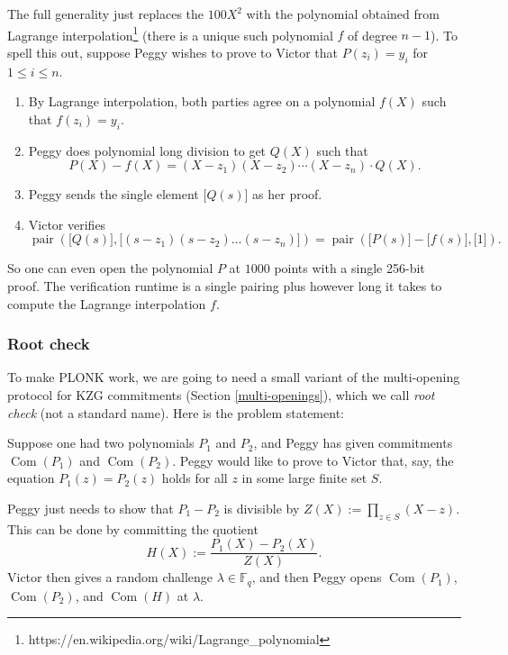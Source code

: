 The full generality just replaces the \(100X^{2}\) with the polynomial
obtained from Lagrange interpolation\footnote{https://en.wikipedia.org/wiki/Lagrange\_polynomial}
(there is a unique such polynomial \(f\) of degree \(n - 1\)). To spell
this out, suppose Peggy wishes to prove to Victor that
\(P( z_{i} ) = y_{i}\) for \(1 \leq i \leq n\).

\begin{algo}
\leavevmode
\begin{enumerate}
\item
  By Lagrange interpolation, both parties agree on a polynomial \(f(X)\)
  such that \(f( z_{i} ) = y_{i}\).
\item
  Peggy does polynomial long division to get \(Q(X)\) such that
  \[P(X) - f(X) = ( X - z_{1} )( X - z_{2} )\cdots( X - z_{n} ) \cdot Q(X).\]
\item
  Peggy sends the single element \(\lbrack Q(s) \rbrack\) as
  her proof.
\item
  Victor verifies 
\[  \operatorname{pair}(\lbrack Q(s) \rbrack,\lbrack ( s - z_{1} )( s - z_{2} )\ldots( s - z_{n} ) \rbrack) = \operatorname{pair}(\lbrack P(s) \rbrack - \lbrack f(s) \rbrack,\lbrack 1\rbrack). \]
\end{enumerate}
\end{algo}

So one can even open the polynomial \(P\) at \(1000\) points with a
single 256-bit proof. The verification runtime is a single pairing plus
however long it takes to compute the Lagrange interpolation \(f\).

\subsubsection{Root check}

To make PLONK work, we are going to need a small variant of the
multi-opening protocol for KZG commitments
(Section \ref{multi-openings}), which we call
\emph{root check} (not a standard name). Here is the problem statement:

\begin{problem}
Suppose one had two polynomials $P_1$ and $P_2$, 
and Peggy has given commitments
$\operatorname{Com}(P_1)$ and $\operatorname{Com}(P_2)$.
Peggy would like to prove to Victor that, say,
the equation $P_1(z) = P_2(z)$ holds for all $z$ in some large finite set $S$.
\end{problem}

Peggy just needs to show that \(P_{1} - P_{2}\) is divisible by
\(Z(X) := \prod_{z \in S}(X - z)\). This can be done by committing the
quotient \[H(X) := \frac{P_{1}(X) - P_{2}(X)}{Z(X)}.\] Victor then gives
a random challenge \(\lambda \in \mathbb{F}_{q}\), and then Peggy opens
\(\operatorname{Com}( P_{1} )\),
\(\operatorname{Com}( P_{2} )\), and \(\operatorname{Com}(H)\) at
\(\lambda\).

